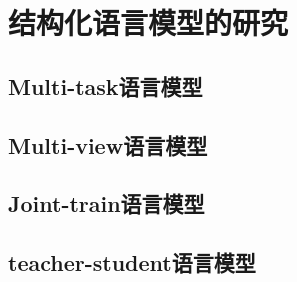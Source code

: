 

\chapter{结构化语言模型的研究}
\label{chap:struclm}

\section{Multi-task语言模型}

\section{Multi-view语言模型}

\section{Joint-train语言模型}

\section{teacher-student语言模型}


